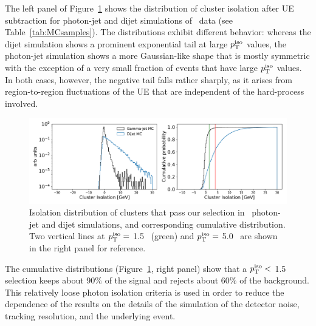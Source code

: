 The left panel of Figure~\ref{MC_Isolation} shows the distribution of cluster isolation after UE subtraction for photon-jet and dijet simulations of \pPb~data (see Table~\ref{tab:MCsamples}). The distributions exhibit different behavior: whereas the dijet simulation shows a prominent exponential tail at large $p_{\mathrm{T}}^\mathrm{iso}$ values, the photon-jet simulation shows a more Gaussian-like shape that is mostly symmetric with the exception of a very small fraction of events that have large $p_{\mathrm{T}}^\mathrm{iso}$ values. In both cases, however, the negative tail falls rather sharply, as it arises from region-to-region fluctuations of the UE that are independent of the hard-process involved. 

\begin{figure}[h]
\center
\includegraphics[width=1.0\textwidth]{Data_Analysis/Isolation/IsolationMCsignal_Skimmed_17g6a1_pthat1_4L_root}
\caption{Isolation distribution of clusters that pass our selection in \pPb~photon-jet and dijet simulations, and corresponding cumulative distribution. Two vertical lines at $p_{\mathrm{T}}^\mathrm{iso}=$ 1.5 \GeVc~(green) and $p_{\mathrm{T}}^\mathrm{iso}=$ 5.0 \GeVc~are shown in the right panel for reference.}
\label{MC_Isolation}
\end{figure}


The cumulative distributions (Figure~\ref{MC_Isolation}, right panel) show that a {$p_{\mathrm{T}}^\mathrm{iso}<$ 1.5 \GeVc} selection keeps about 90$\%$ of the signal and rejects about 60$\%$ of the background. This relatively loose photon isolation criteria is used in order to reduce the dependence of the results on the details of the simulation of the detector noise, tracking resolution, and the underlying event. 


